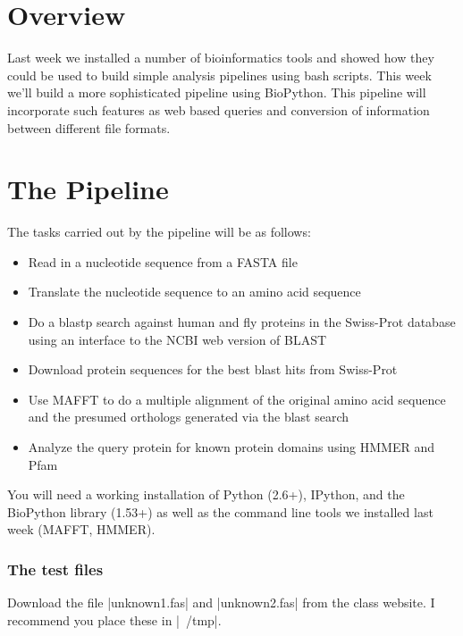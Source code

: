 
\section{Overview}

Last week we installed a number of bioinformatics tools and showed how they could be used to build simple analysis pipelines using bash scripts.  This week we'll build a more sophisticated pipeline using BioPython.  This pipeline will incorporate such features as web based queries and conversion of information between different file formats.

\section{The Pipeline}


The tasks carried out by the pipeline will be as follows:

\begin{itemize}

\item Read in a nucleotide sequence from a FASTA file
\item Translate the nucleotide sequence to an amino acid sequence
\item Do a blastp search against human and fly proteins in the Swiss-Prot database using an interface to the NCBI web version of BLAST
\item Download protein sequences for the best blast hits from Swiss-Prot
\item Use MAFFT to do a multiple alignment of the original amino acid sequence and the presumed orthologs generated via the blast search
\item Analyze the query protein for known protein domains using HMMER and Pfam

\end{itemize} 


You will need a working installation of Python (2.6+), IPython, and the BioPython library (1.53+) as well as the command line tools we installed last week (MAFFT, HMMER). 

\subsubsection{The test files}

Download the file |unknown1.fas| and |unknown2.fas| from the class website. I recommend you place these in |~/tmp|.


